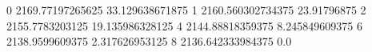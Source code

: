 0 2169.77197265625 33.129638671875
1 2160.560302734375 23.91796875
2 2155.7783203125 19.135986328125
4 2144.88818359375 8.245849609375
6 2138.9599609375 2.317626953125
8 2136.642333984375 0.0
